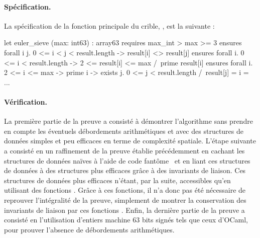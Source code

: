 \documentclass[a4paper]{easychair}
\begin{document}
\paragraph{Spécification.}
La spécification de la fonction principale du crible,
, est la suivante :

\begin{why3}
let euler_sieve (max: int63) : array63
  requires { max_int > max >= 3 }
  ensures  { forall i j. 0 <= i < j < result.length -> result[i] <> result[j] }
  ensures  { forall i. 0 <= i < result.length -> 2 <= result[i] <= max /\ prime result[i] }
  ensures  { forall i. 2 <= i <= max -> prime i ->
                  exists j. 0 <= j < result.length /\ result[j] = i }
= ...
\end{why3}






\paragraph{Vérification.}

La première partie de la preuve a consisté à démontrer l'algorithme sans prendre
en compte les éventuels débordements arithmétiques et avec des structures
de données simples et peu efficaces en terme de complexité spatiale.
L'étape suivante a consisté en un raffinement de la preuve établie précédemment
en cachant les structures de données naïves à l'aide de code
fantôme~\cite{ghost-code} et en liant ces structures de données à des structures
plus efficaces grâce à des invariants de liaison. Ces structures de données plus
efficaces n'étant, par la suite, accessibles qu'en utilisant des fonctions
. Grâce à ces fonctions, il n'a donc pas été
nécessaire de reprouver l'intégralité de la preuve, simplement de montrer la
conservation des invariants de liaison par ces fonctions .
Enfin, la dernière partie de la preuve a consisté en l'utilisation d'entiers
machine 63 bits signés tels que ceux d'OCaml, pour prouver l'absence de
débordements arithmétiques.
\end{document}
